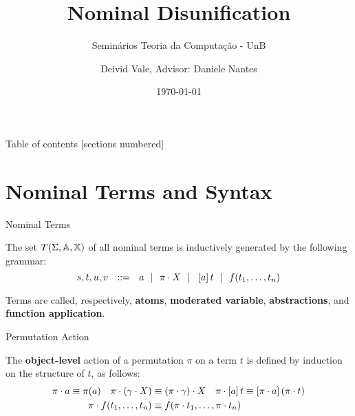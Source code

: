 \documentclass{beamer}
\title{Nominal Disunification}
\subtitle{Seminários Teoria da Computação - UnB}
\date{\today}
\author{Deivid Vale, Advisor: Daniele Nantes }
\institute{Department of Mathematics - University of Brasilia}
\begin{document}
    \maketitle

    \begin{frame}{Table of contents}
        [sections numbered]
        \tableofcontents[hideallsubsections]
    \end{frame}

    \section{Nominal Terms and Syntax}


    \begin{frame}{Nominal Terms}
        \begin{definition}\label{definition:nominal-terms} The set $T(\Sigma,\mathbb{A},\mathbb{X})$ of all nominal terms is inductively generated by the following grammar:
            $$s,t,u,v \ \ ::= \ \ a \ \ | \ \ \pAction{\pi}{X} \ \ | \ \ \abs{a}{t} \ \ | \ \ f(t_1, \dots, t_n) $$
        \end{definition}
        Terms are called, respectively, \textbf{atoms}, \textbf{moderated variable}, \textbf{abstractions}, and \textbf{function application}.
    \end{frame}

    \begin{frame}{Permutation Action}
        \begin{definition}\label{definition:object-level-permutation-action}
            The \textbf{object-level} action of a permutation $\pi$ on a term $t$ is defined by induction on the structure of $t$, as follows:
            \begin{align*}
                \pi \cdot a \equiv \pi(a) \quad \pi \cdot (\gamma \cdot X) & \equiv (\pi \cdot \gamma) \cdot X \quad \pi \cdot \left[ a \right]t \equiv \left[ \pi \cdot a \right](\pi \cdot t) \\
                \pi \cdot f(t_1,\dots,t_n)                                           & \equiv f(\pi \cdot t_1,\dots,\pi \cdot t_n)
            \end{align*}
        \end{definition}
    \end{frame}
\end{document}
